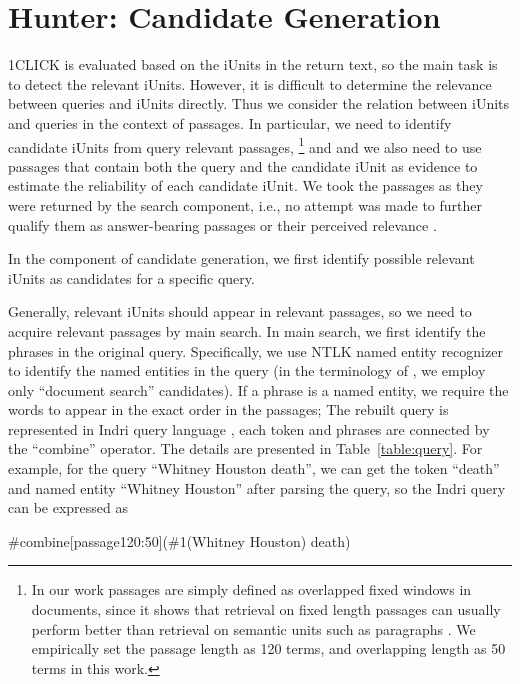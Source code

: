 \section{Hunter: Candidate Generation}
1CLICK is evaluated based on the iUnits in the return text, so the
main task is to detect the relevant iUnits. However, it is difficult
to determine the relevance between queries and iUnits directly. Thus
we consider the relation between iUnits and queries in the context
of passages. In particular, we need to identify candidate iUnits
from query relevant passages, \footnote{In our work passages are
simply defined as overlapped fixed windows in documents, since it
shows that retrieval on fixed length passages can usually perform
better than retrieval on semantic units such as paragraphs
\cite{Callan_SIGIR94,Zobel_etal_IPM95}. We empirically set the
passage length as 120 terms, and overlapping length as 50 terms in
this work.} and and we also need to use passages that contain both
the query and the candidate iUnit as evidence to estimate the
reliability of each candidate iUnit. We took the passages as they
were returned by the search component, i.e., no attempt was made to
further qualify them as answer-bearing passages
\cite{conf/cikm/KrikonCK12} or their perceived relevance
\cite{he-duboue-nie:2012:PAPERS}.

In the component of candidate generation, we first identify possible relevant iUnits as candidates for a specific query.

Generally, relevant iUnits should appear in relevant passages, so we need to acquire relevant passages by main search.
In main search, we first identify the phrases in the original query.
Specifically, we use NTLK named entity recognizer to identify the named entities in the query (in the terminology of \cite{conf/aaai/Chu-CarrollF11}, we employ only ``document search'' candidates).
If a phrase is a named entity, we require the words to appear in the exact order in the passages;
The rebuilt query is represented in Indri query language \cite{strohman_ICIA2005}, each token and phrases are connected by the ``combine'' operator.
The details are presented in Table~\ref{table:query}.
For example, for the query ``Whitney Houston death'', we can get the token ``death'' and named entity ``Whitney Houston'' after parsing the query, so the Indri query can be expressed as

\begin{center}
\#combine[passage120:50](\#1(Whitney Houston) death)
\end{center}

